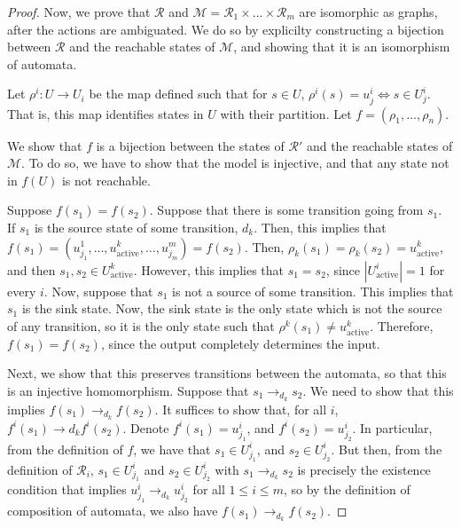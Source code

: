 \documentclass[11pt]{article}
\begin{document}
\begin{proof}
    Now, we prove that $\mathcal{R}$ and $\mathcal{M} = \mathcal{R}_{1} \times \ldots \times \mathcal{R}_{m}$ are isomorphic as graphs, after the actions are ambiguated.
    We do so by explicilty constructing a bijection between $\mathcal{R}$ and the reachable states of $\mathcal{M}$, and showing that it is an isomorphism of automata.

    Let $\rho^{i} : U \to U_{i}$ be the map defined such that for $s \in U$, $\rho^{i}(s) = u^{i}_j \iff s \in U^{i}_j$.
    That is, this map identifies states in $U$ with their partition.
    Let $f = (\rho_1, \ldots, \rho_n)$.


    We show that $f$ is a bijection between the states of $\mathcal{R}'$ and the reachable states of $\mathcal{M}$.
    To do so, we have to show that the model is injective, and that any state not in $f(U)$ is not reachable.

    Suppose $f(s_1) = f(s_2)$.
    Suppose that there is some transition going from $s_1$.
    If $s_1$ is the source state of some transition, $d_k$. Then, this implies that $f(s_1) = (u^{1}_{j_1},\ldots, u^{k}_{\text{active}}, \ldots,  u^{m}_{j_m}) = f(s_2)$.
    Then, $\rho_{k}(s_1) = \rho_{k}(s_2) = u^{k}_{\text{active}}$, and then $s_1, s_2 \in U^{k}_{\text{active}}$.
    However, this implies that $s_1 = s_2$, since $|U^{i}_{\text{active}}| = 1$ for every $i$.
    Now, suppose that $s_1$ is not a source of some transition.
    This implies that $s_1$ is the sink state.
    Now, the sink state is the only state which is not the source of any transition, so it is the only state such that $\rho^{k}(s_1) \neq u^{k}_{\text{active}}$.
    Therefore, $f(s_1) = f(s_2)$, since the output completely determines the input.

    Next, we show that this preserves transitions between the automata, so that this is an injective homomorphism.
    Suppose that $s_1 \to_{d_k} s_2$.
    We need to show that this implies $f(s_1) \to_{d_k} f(s_2)$.
    It suffices to show that, for all $i$, $f^{i}(s_1) \to d_k f^{i}(s_2)$.
    Denote $f^i(s_1) = u^{i}_{j_1}$, and $f^{i}(s_2) = u^{i}_{j_2}$.
    In particular, from the definition of $f$, we have that $s_1 \in U^{i}_{j_1}$, and $s_2 \in U^{i}_{j_2}$.
    But then, from the definition of $\mathcal{R}_{i}$, $s_1 \in U^{i}_{j_1}$ and $s_2 \in U^{i}_{j_2}$ with $s_1 \to_{d_k} s_2$ is precisely the existence condition that implies $u^{i}_{j_1} \to_{d_k} u^{i}_{j_2}$ for all $1 \leq i \leq m$, so by the definition of composition of automata, we also have $f(s_1) \to_{d_k} f(s_2)$.
    

\end{proof}
\end{document}
